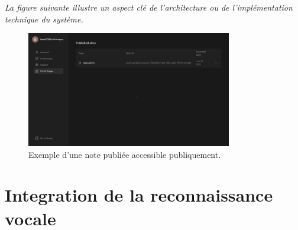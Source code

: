 \noindent
\textit{La figure suivante illustre un aspect clé de l'architecture ou de l'implémentation technique du système.}
\begin{figure}[H]
    \centering
    \includegraphics[width=0.8\textwidth]{assets/docs/web/dashboard-public-page-dark.png}
    \caption{Exemple d'une note publiée accessible publiquement.}
    \label{fig:web-public-note}
\end{figure}




\section{Integration de la reconnaissance vocale}

